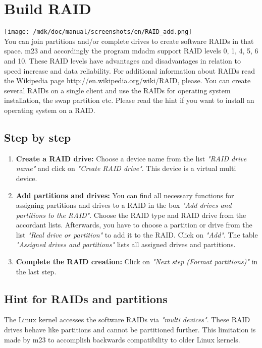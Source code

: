 \section{Build RAID}
\texttt{[image: /mdk/doc/manual/screenshots/en/RAID\_add.png]} \\
You can join partitions and/or complete drives to create software RAIDs in that space. m23 and accordingly the program mdadm support RAID levels 0, 1, 4, 5, 6 and 10. These RAID levels have advantages and disadvantages in relation to speed increase and data reliability. For additional information about RAIDs read the Wikipedia page http://en.wikipedia.org/wiki/RAID, please. You can create several RAIDs on a single client and use the RAIDs for operating system installation, the swap partition etc. Please read the hint if you want to install an operating system on a RAID.\\
\subsection{Step by step}
\begin{enumerate}
\item \textbf{Create a RAID drive:} Choose a device name from the list \textit{"RAID drive name"} and click on \textit{"Create RAID drive"}. This device is a virtual multi device.\\
\item \textbf{Add partitions and drives:} You can find all necessary functions for assigning partitions and drives to a RAID in the box \textit{"Add drives and partitions to the RAID"}. Choose the RAID type and RAID drive from the accordant lists. Afterwards, you have to choose a partition or drive from the list \textit{"Real drive or partition"} to add it to the RAID. Click on \textit{"Add"}. The table \textit{"Assigned drives and partitions"} lists all assigned drives and partitions.\\
\item \textbf{Complete the RAID creation:} Click on \textit{"Next step (Format partitions)"} in the last step.\\
\end{enumerate}
\subsection{Hint for RAIDs and partitions}
The Linux kernel accesses the software RAIDs via \textit{"multi devices"}. These RAID drives behave like partitions and cannot be partitioned further. This limitation is made by m23 to accomplish backwards compatibility to older Linux kernels.\\
